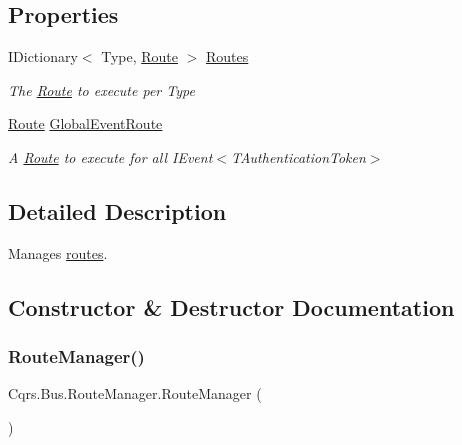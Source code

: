 \subsection*{Properties}
\begin{DoxyCompactItemize}
\item 
I\+Dictionary$<$ Type, \hyperlink{classCqrs_1_1Bus_1_1Route}{Route} $>$ \hyperlink{classCqrs_1_1Bus_1_1RouteManager_ad6a3c8e41e10f62d075e52d08d817cee_ad6a3c8e41e10f62d075e52d08d817cee}{Routes}
\begin{DoxyCompactList}\small\item\em The \hyperlink{classCqrs_1_1Bus_1_1Route}{Route} to execute per Type \end{DoxyCompactList}\item 
\hyperlink{classCqrs_1_1Bus_1_1Route}{Route} \hyperlink{classCqrs_1_1Bus_1_1RouteManager_a083b3775e28b500eca7351c9990e15a3_a083b3775e28b500eca7351c9990e15a3}{Global\+Event\+Route}
\begin{DoxyCompactList}\small\item\em A \hyperlink{classCqrs_1_1Bus_1_1Route}{Route} to execute for all I\+Event$<$\+T\+Authentication\+Token$>$ \end{DoxyCompactList}\end{DoxyCompactItemize}


\subsection{Detailed Description}
Manages \hyperlink{classCqrs_1_1Bus_1_1Route}{routes}. 



\subsection{Constructor \& Destructor Documentation}
\mbox{\label{classCqrs_1_1Bus_1_1RouteManager_abcc8a62319ac7a6edd38ed2d26ef5234_abcc8a62319ac7a6edd38ed2d26ef5234}} 
\subsubsection{\texorpdfstring{Route\+Manager()}{RouteManager()}}
{\footnotesize\ttfamily Cqrs.\+Bus.\+Route\+Manager.\+Route\+Manager (\begin{DoxyParamCaption}{ }\end{DoxyParamCaption})}



